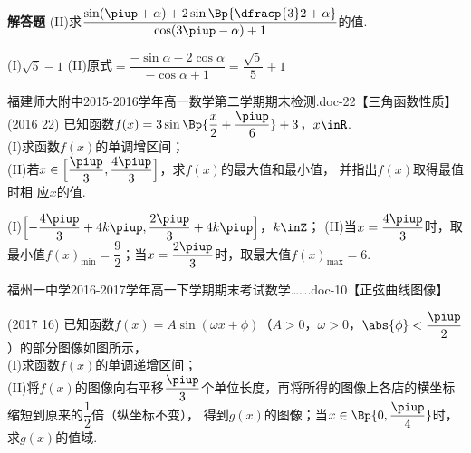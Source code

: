 \begin{exercise}{\bf 解答题}
      (II)求$\dfrac{\sin(\piup+\alpha)+2\sin\Bp{\dfracp{3}2+\alpha}}{\cos(3\piup-\alpha)+1}$的值.
      \begin{answer}
        (I)$\sqrt5-1$
        (II)原式$=\dfrac{-\sin\alpha-2\cos\alpha}{-\cos\alpha+1}=\dfrac{\sqrt5}5+1$
      \end{answer}
    \item 福建师大附中2015-2016学年高一数学第二学期期末检测.doc-22【三角函数性质】\\
      (2016  22)
      已知函数$f(x)=3\sin\Bp{\dfrac{x}2+\dfrac{\piup}6}+3$，$x\inR$.\\
      (I)求函数$f(x)$的单调增区间；\\
      (II)若$x\in\Bigl[\dfrac{\piup}3,\dfrac{4\piup}3\Bigr]$，求$f(x)$的最大值和最小值，
      并指出$f(x)$取得最值时相
      应$x$的值.
      \begin{answer}
        (I)$\Bigl[-\dfrac{4\piup}3+4k\piup,\dfrac{2\piup}3+4k\piup\Bigr]$，$k\inZ$；
        (II)当$x=\dfrac{4\piup}3$时，取最小值$f(x)_{\min}=\dfrac92$；当$x=\dfrac{2\piup}3$时，取最大值$f(x)_{\max}=6$.
      \end{answer}
    \item 福州一中学2016-2017学年高一下学期期末考试数学…….doc-10【正弦曲线图像】\\
      \begin{minipage}[t]{0.7\linewidth}
        \vspace{-1.2cm}
        (2017  16)
        已知函数$f(x)=A\sin(\omega x+\phi)$（$A>0$，$\omega>0$，$\abs{\phi}<\dfrac{\piup}2$）的部分图像如图所示，\\
        (I)求函数$f(x)$的单调递增区间；\\
        (II)将$f(x)$的图像向右平移$\dfrac{\piup}3$个单位长度，再将所得的图像上各店的横坐标缩短到原来的$\dfrac12$倍（纵坐标不变），
        得到$g(x)$的图像；当$x\in\Bp{0,\dfrac{\piup}4}$时，求$g(x)$的值域.
      \end{minipage}\hfill
      \begin{minipage}[h]{0.3\linewidth}
        \begin{center}
\end{center}
\end{minipage}
\end{exercise}
